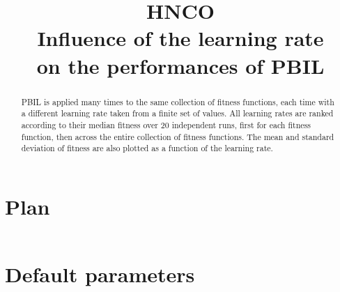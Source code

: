 \documentclass[a4paper]{article}
\begin{document}

\title{HNCO\\
  Influence of the learning rate\\
  on the performances of PBIL}
\maketitle

\begin{abstract}
  PBIL is applied many times to the same collection of fitness
  functions, each time with a different learning rate taken from a
  finite set of values. All learning rates are ranked according to
  their median fitness over 20 independent runs, first for each
  fitness function, then across the entire collection of fitness
  functions. The mean and standard deviation of fitness are also
  plotted as a function of the learning rate.
\end{abstract}

\tableofcontents

\newpage

\section{Plan}

\inputminted[breaklines=true]{json}{../plan-compact.json}



\newpage

\section{Default parameters}

\inputminted[breaklines=true]{text}{../log.default}
\end{document}
